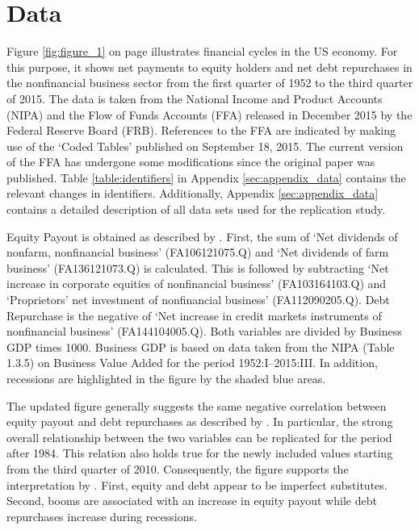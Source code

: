 \section{Data}
\label{sec:data}



Figure \ref{fig:figure_1} on page \pageref{fig:figure_1} illustrates financial cycles in the US economy. For this purpose, it shows net payments to equity holders and net debt repurchases in the nonfinancial business sector from the first quarter of 1952 to the third quarter of 2015. The data is taken from the National Income and Product Accounts (NIPA) and the Flow of Funds Accounts (FFA) released in December 2015 by the Federal Reserve Board (FRB). References to the FFA are indicated by making use of the ‘Coded Tables’ published on September 18, 2015. The current version of the FFA has undergone some modifications since the original paper was published. Table \ref{table:identifiers} in Appendix \ref{sec:appendix_data} contains the relevant changes in identifiers. Additionally, Appendix \ref{sec:appendix_data} contains a detailed description of all data sets used for the replication study.

Equity Payout is obtained as described by \citeauthor{JERMANNfinancial}. First, the sum of ‘Net dividends of nonfarm, nonfinancial business’ (FA106121075.Q) and ‘Net dividends of farm business’ (FA136121073.Q) is calculated. This is followed by subtracting ‘Net increase in corporate equities of nonfinancial business’ (FA103164103.Q) and ‘Proprietors’ net investment of nonfinancial business’ (FA112090205.Q). Debt Repurchase is the negative of ‘Net increase in credit markets instruments of nonfinancial business’ (FA144104005.Q). Both variables are divided by Business GDP times 1000. Business GDP is based on data taken from the NIPA (Table 1.3.5) on Business Value Added for the period 1952:I--2015:III. In addition, recessions are highlighted in the figure by the shaded blue areas.

The updated figure generally suggests the same negative correlation between equity payout and debt repurchases as described by \citeauthor{JERMANNfinancial}. In particular, the strong overall relationship between the two variables can be replicated for the period after 1984. This relation also holds true for the newly included values starting from the third quarter of 2010. 
Consequently, the figure supports the interpretation by \citeauthor{JERMANNfinancial}. First, equity and debt appear to be imperfect substitutes. Second, booms are associated with an increase in equity payout while debt repurchases increase during recessions.
